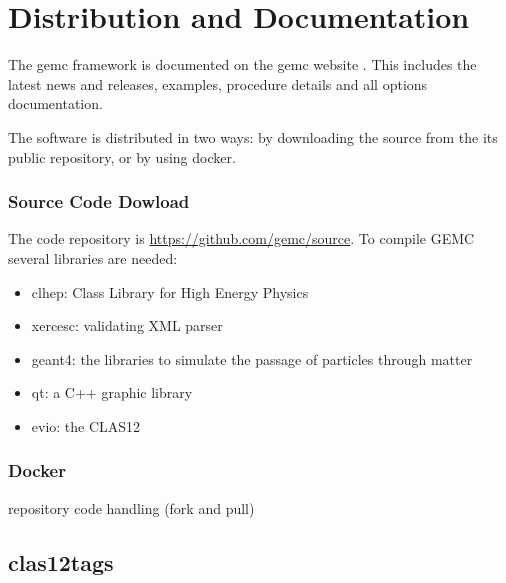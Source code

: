 \section{Distribution and Documentation}

The gemc framework is documented on the gemc website \cite{gemc}. This includes the latest news and releases,
examples, procedure details and all options documentation.

The software is distributed in two ways: by downloading the source from the its public repository, or by using docker.


\subsubsection{Source Code Dowload}

The code repository is \url{https://github.com/gemc/source}. To compile GEMC several libraries are needed:

\begin{itemize}
	\item clhep: Class Library for High Energy Physics \cite{clhep}
	\item xercesc: validating XML parser \cite{xercesc}
	\item geant4: the libraries to simulate the passage of particles through matter \cite{geant4}
	\item qt: a C++ graphic library \cite{qt}
	\item evio: the CLAS12 
\end{itemize}


\subsubsection{Docker}




repository code handling (fork and pull)

\subsection{clas12tags} 




